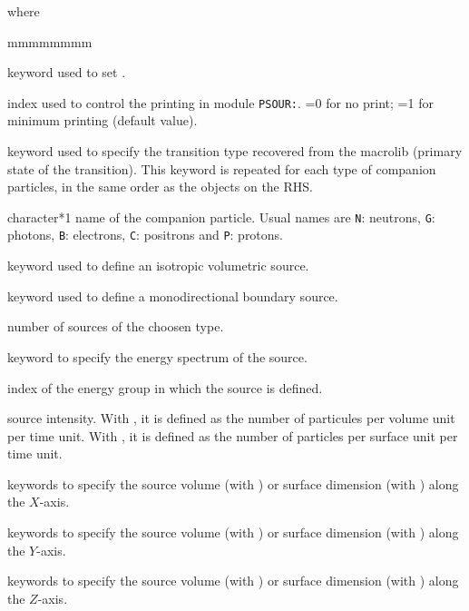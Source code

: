 \noindent where
\begin{ListeDeDescription}{mmmmmmmm}

\item[\moc{EDIT}] keyword used to set .

\item[\dusa{iprint}] index used to control the printing in module {\tt PSOUR:}. =0 for no print; =1 for minimum printing (default value).

\item[\moc{PARTICLE}] keyword used to specify the transition type recovered from the {\sc macrolib} (primary state of the transition). This keyword is repeated for each type of companion particles, in the same order as the  objects on the RHS.

\item[\dusa{htype}] character*1 name of the companion particle. Usual names are {\tt N}: neutrons, {\tt G}: photons, {\tt B}: electrons,
{\tt C}: positrons and {\tt P}: protons.

\item[\moc{ISO}] keyword used to define an isotropic volumetric source. 

\item[\moc{MONO}] keyword used to define a monodirectional boundary source.

\item[\dusa{nsource}] number of sources of the choosen type.

\item[\moc{INTG}] keyword to specify the energy spectrum of the source.

\item[\dusa{ig}] index of the energy group in which the source is defined.

\item[\dusa{int}] source intensity. With , it is defined as the number of particules per volume unit per time unit. With , it is defined as the number of particles per surface unit per time unit.

\item[\moc{XLIM}] keywords to specify the  source volume (with ) or surface dimension (with ) along the $X$-axis.

\item[\moc{YLIM}] keywords to specify the  source volume (with ) or surface dimension (with ) along the $Y$-axis.

\item[\moc{ZLIM}] keywords to specify the  source volume (with ) or surface dimension (with ) along the $Z$-axis.  


\end{ListeDeDescription}
